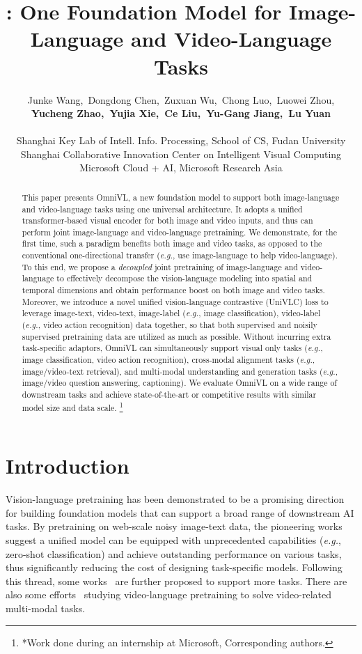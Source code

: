 \documentclass{article}
\title{{\system}: One Foundation Model for Image-Language and Video-Language Tasks}
\author{Junke Wang,~Dongdong Chen,~Zuxuan Wu,~Chong Luo,~Luowei Zhou, \\ \textbf{Yucheng Zhao,~Yujia Xie,~Ce Liu,~Yu-Gang Jiang,~Lu Yuan}\\
\\
Shanghai Key Lab of Intell. Info. Processing, School of CS, Fudan University \\
Shanghai Collaborative Innovation Center on Intelligent Visual Computing \\
Microsoft Cloud + AI, Microsoft Research Asia 
}
\makeatletter
\newcommand*{\system}{OmniVL\@\xspace}
\newcommand*{\eg}{\emph{e.g.}\@\xspace}
\newcommand\blfootnote[1]{\begingroup
  \renewcommand\thefootnote{}\footnote{#1}\addtocounter{footnote}{-1}\endgroup
}
\makeatother
\begin{document}
\maketitle

\begin{abstract}
This paper presents \system, a new foundation model to support both image-language and video-language tasks using one universal architecture. It adopts a unified transformer-based visual encoder for both image and video inputs, and thus can perform joint image-language and video-language pretraining. We demonstrate, for the first time, such a paradigm benefits both image and video tasks, as opposed to the conventional one-directional transfer (\eg, use image-language to help video-language). To this end, we propose a \emph{decoupled} joint pretraining of image-language and video-language to effectively decompose the vision-language modeling into spatial and temporal dimensions and obtain performance boost on both image and video tasks. Moreover, we introduce a novel unified vision-language contrastive (UniVLC) loss to leverage image-text, video-text, image-label (\eg, image classification), video-label (\eg, video action recognition) data together, so that both supervised and noisily supervised pretraining data are utilized as much as possible. Without incurring extra task-specific adaptors, \system can simultaneously support visual only tasks (\eg, image classification, video action recognition), cross-modal alignment tasks (\eg, image/video-text retrieval), and multi-modal understanding and generation tasks (\eg, image/video question answering, captioning). We evaluate \system on a wide range of downstream tasks and achieve state-of-the-art or competitive results with similar model size and data scale. \blfootnote{*Work done during an internship at Microsoft, Corresponding authors.}
\end{abstract}

\section{Introduction}

Vision-language pretraining has been demonstrated to be a promising direction for building foundation models that can support a broad range of downstream AI tasks. By pretraining on web-scale noisy image-text data, the pioneering works~\cite{radford2021learning,hu2021scaling,yuan2021florence} suggest a unified model can be equipped with unprecedented capabilities (\eg, zero-shot classification) and achieve outstanding performance on various tasks, thus significantly reducing the cost of designing task-specific models. Following this thread, some works~\cite{singh2021flava,wang2022OFA,alayrac2022flamingo,li2022blip,zhu2021uni} are further proposed to support more tasks. There are also some efforts~\cite{fu2021violet,zellers2021merlot} studying video-language pretraining to solve video-related multi-modal tasks.  
\end{document}
